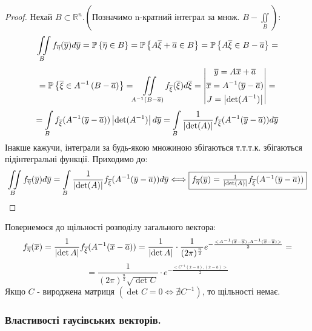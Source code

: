 \begin{proof} Нехай $B \subset \mathbb{R}^n. \left( \text{Позначимо n-кратний інтеграл за множ. } B -  \iint\limits_{B} \right) $:
$$
  \iint\limits_{B} f_{\overline{\eta}} (\overline{y})d \overline{y}=\mathbb{P} \left\lbrace \overline{\eta} \in B \right\rbrace = \mathbb{P} \left\lbrace  A \overline{\xi} + \overline{a} \in B \right\rbrace = \mathbb{P} \left\lbrace  A \overline{\xi} \in B - \overline{a} \right\rbrace =
$$
$$
 = \mathbb{P} \left\lbrace \overline{\xi} \in A^{-1} \left( B - \overline{a} \right)  \right\rbrace = \iint\limits_{A^{-1} \left( B - \overline{a} \right) } f_{\overline{\xi}} ( \overline{\xi}) d \overline{\xi} = \left| \begin{gathered}
  \overline{y} = A \overline{x} + \overline{a}\\
	\overline{x}=  A^{-1} (\overline{y} - \overline{a})\\
	J = \left| \det (A^{-1}) \right|
 \end{gathered} \right| =
$$
$$
= \int\limits_{B}{ f_ {\overline{\xi}} ( A^{-1}( \overline{y} - \overline{a}) )  \left| \det (A^{-1}) \right| d \overline{y}  } =  \int\limits_{B}{ \frac{1}{ \left| \det(A) \right| }  f_ {\overline{\xi}} ( A^{-1}( \overline{y} - \overline{a}) ) d \overline{y}  }
$$
Інакше кажучи, інтеграли за будь-якою множиною збігаються т.т.т.к. збігаються підінтегральні функції. Приходимо до:
$$
  \iint\limits_{B} f_{\overline{\eta}} (\overline{y})d \overline{y}= \int\limits_{B}{ \frac{1}{ \left| \det(A) \right| }  f_ {\overline{\xi}} ( A^{-1}( \overline{y} - \overline{a}) ) d \overline{y}  } \Longleftrightarrow   \fbox{$f_{\overline{\eta}} (\overline{y}) = \frac{1}{ \left| \det(A) \right| }  f_ {\overline{\xi}} ( A^{-1}( \overline{y} - \overline{a}) ) $}
$$
\end{proof}

Повернемося до щільності розподілу загального вектора:
$$
f_{\overline{\eta}} (\overline{x} )  = \frac{1}{ \left| \det{A} \right|  } f_{\overline{\xi}} (A^{-1} (\overline{x} - \overline{a})) = \frac{1}{ \left| \det{A} \right|  } \cdot \frac{1}{(2\pi)^{ \frac{n}{2} }} e^{- \frac{<A^{-1}(\overline{x} - \overline{a}), A^{-1}(\overline{x} - \overline{a})>}{2} } =
$$
$$
= \frac{1}{ (2\pi)^{ \frac{n}{2} } \sqrt{\det{C} } } \cdot e^{- \frac{<C^{-1}(\overline{x} - \overline{a}), (\overline{x} - \overline{a})>}{2}  }
$$
Якщо $C$ - вироджена матриця $(\det C = 0 \Leftrightarrow \nexists C^{-1})$, то щільності немає.
\def\vtheta{\overline{\theta}}

\subsubsection{Властивості гаусівських векторів.}

